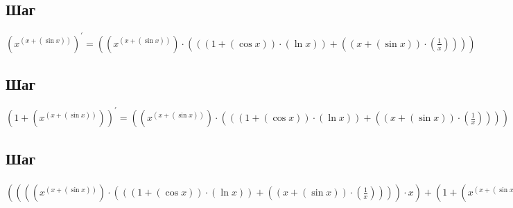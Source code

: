 \documentclass[12pt, letterpaper]{report}
\begin{document}
\subsection{Шаг}
\begin{center} $({x}^{({x}+{(\sin{x})})})^{\prime} = ({({x}^{({x}+{(\sin{x})})})}\cdot{({({({1}+{(\cos{x})})}\cdot{(\ln{x})})}+{({({x}+{(\sin{x})})}\cdot{(\frac{1}{x})})})})$ \end{center} 

\subsection{Шаг}
\begin{center} $({1}+{({x}^{({x}+{(\sin{x})})})})^{\prime} = ({({x}^{({x}+{(\sin{x})})})}\cdot{({({({1}+{(\cos{x})})}\cdot{(\ln{x})})}+{({({x}+{(\sin{x})})}\cdot{(\frac{1}{x})})})})$ \end{center} 

\subsection{Шаг}
\begin{center} $({({({({x}^{({x}+{(\sin{x})})})}\cdot{({({({1}+{(\cos{x})})}\cdot{(\ln{x})})}+{({({x}+{(\sin{x})})}\cdot{(\frac{1}{x})})})})}\cdot{x})}+{({1}+{({x}^{({x}+{(\sin{x})})})})})^{\prime} = ({({({({({({({x}^{({x}+{(\sin{x})})})}\cdot{({({({1}+{(\cos{x})})}\cdot{(\ln{x})})}+{({({x}+{(\sin{x})})}\cdot{(\frac{1}{x})})})})}\cdot{({({({1}+{(\cos{x})})}\cdot{(\ln{x})})}+{({({x}+{(\sin{x})})}\cdot{(\frac{1}{x})})})})}+{({({x}^{({x}+{(\sin{x})})})}\cdot{({({({({-1}\cdot{(\sin{x})})}\cdot{(\ln{x})})}+{({({1}+{(\cos{x})})}\cdot{(\frac{1}{x})})})}+{({({({1}+{(\cos{x})})}\cdot{(\frac{1}{x})})}+{({({x}+{(\sin{x})})}\cdot{(\frac{-1}{({x}^{2})})})})})})})}\cdot{x})}+{({({x}^{({x}+{(\sin{x})})})}\cdot{({({({1}+{(\cos{x})})}\cdot{(\ln{x})})}+{({({x}+{(\sin{x})})}\cdot{(\frac{1}{x})})})})})}+{({({x}^{({x}+{(\sin{x})})})}\cdot{({({({1}+{(\cos{x})})}\cdot{(\ln{x})})}+{({({x}+{(\sin{x})})}\cdot{(\frac{1}{x})})})})})$ \end{center} 

\end{document}
